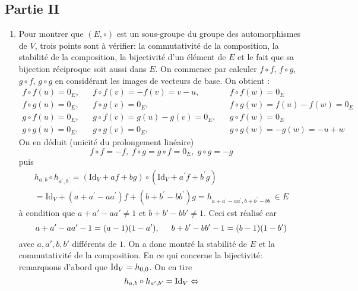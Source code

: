 \subsection*{Partie II}
\begin{enumerate}
\item Pour montrer que $(E,\circ)$ est un sous-groupe du groupe des automorphismes de $V$, trois points sont à vérifier: la commutativité de la composition, la stabilité de la composition, la bijectivité d'un élément de $E$ et le fait que sa bijection réciproque soit aussi dans $E$.\newline
On commence par calculer $f\circ f$, $f \circ g$, $g\circ f$, $g\circ g$ en considérant les images de vecteurs de base. On obtient :
\begin{align*}
f\circ f (u)=0_E , & & f\circ f (v)=-f(v)=v-u ,    & & f\circ f (w)=0_E  \\
f\circ g (u)=0_E , & & f\circ g (v)=0_E ,          & & f\circ g (w)=f(u)-f(w)=0_E  \\
g\circ f (u)=0_E , & & g\circ f (v)=g(u)-g(v)=0_E ,& & g\circ f (w)=0_E  \\
g\circ g (u)=0_E , & & g\circ g (v)=0_E,           & & g\circ g (w)=-g(w)=-u+w
\end{align*}
On en déduit (unicité du prolongement linéaire)
\begin{displaymath}
f\circ f = -f ,\; f\circ g = g\circ f = 0_E ,\; g\circ g = -g
\end{displaymath}
puis
\begin{multline*}
h_{a,b}\circ h_{a^\prime,b^\prime} = (\mathrm{Id}_V+af+bg)\circ (\mathrm{Id}_V+a^\prime f+b^\prime g)\\
 =  \mathrm{Id}_V+(a+a^\prime -aa^\prime )f +(b+b^\prime -bb^\prime )g
 = h_{a+a^\prime -aa^\prime , b+b^\prime -bb^\prime } \in E
\end{multline*}
à condition que $a+a'-aa'\neq 1$ et $b+b'-bb'\neq1$. Ceci est réalisé car
\begin{displaymath}
 a+a^\prime -aa^\prime -1 = (a-1)(1-a^\prime),\hspace{0.5cm} b+b^\prime -bb^\prime -1 = (b-1)(1-b^\prime)
\end{displaymath}
avec $a, a', b, b'$ différents de $1$. On a donc montré la stabilité de $E$ et la commutativité de la composition.\newline
En ce qui concerne la bijectivité: remarquons d'abord que $\operatorname{Id}_V = h_{0,0}$. On en tire
\begin{displaymath}
h_{a,b}\circ h_{a^\prime,b^\prime} = \Id_V \Leftrightarrow

\end{displaymath}
\end{enumerate}
